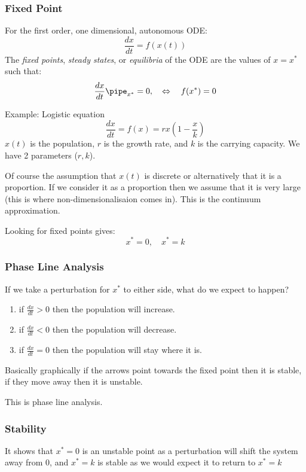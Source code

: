 \documentclass{/home/janmebows/Documents/LatexTemplates/myassignment}
\begin{document}
\subsubsection{Fixed Point}
For the first order, one dimensional, autonomous ODE:
\[\frac{dx}{dt} = f(x(t))\]
The \textit{fixed points}, \textit{steady states}, or \textit{equilibria} of the ODE are the values of $x = x^*$ such that:
\[\frac{dx}{dt}\pipe_{x^*} = 0, \quad \Leftrightarrow \quad f(x^*)=0 \]

Example: Logistic equation
\[\frac{dx}{dt} = f(x) = rx(1-\frac{x}{k})\]
$x(t)$ is the population, $r$ is the growth rate, and $k$ is the carrying capacity. We have 2 parameters ($r,k$).

Of course the assumption that $x(t)$ is discrete or alternatively that it is a proportion. If we consider it as a proportion then we assume that it is very large (this is where non-dimensionalisaion comes in). This is the continuum approximation.

Looking for fixed points gives:
\[x^* = 0, \quad x^* = k\]

\subsubsection{Phase Line Analysis}
If we take a perturbation for $x^*$ to either side, what do we expect to happen?
\begin{enumerate}
    \item if $\frac{dx}{dt} > 0$ then the population will increase. 
    \item if $\frac{dx}{dt} < 0$ then the population will decrease.
    \item if $\frac{dx}{dt} = 0$ then the population will stay where it is.
\end{enumerate} 
Basically graphically if the arrows point towards the fixed point then it is stable, if they move away then it is unstable.

This is phase line analysis.



\subsubsection{Stability}

It shows that $x^*=0$ is an unstable point as a perturbation will shift the system away from $0$, and $x^*=k$ is stable as we would expect it to return to $x^*=k$
\end{document}
